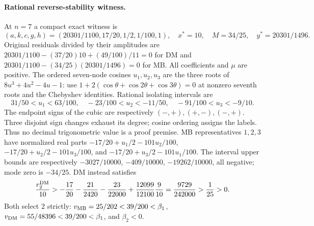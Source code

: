 \paragraph{Rational reverse-stability witness.}
At $n=7$ a compact exact witness is
\begin{equation}
 (a,k,c,g,h)=(20301/1100,17/20,1/2,1/100,1),\quad
 x^*=10,\quad M=34/25,\quad y^*=20301/1496.
 \label{eq:P08-reverse-rational}
\end{equation}
Original residuals divided by their amplitudes are
$20301/1100-(37/20)10+(49/100)/11=0$ for DM and
$20301/1100-(34/25)(20301/1496)=0$ for MB.
All coefficients and $\mu$ are positive.
The ordered seven-node cosines $u_1,u_2,u_3$ are the three roots of
$8u^3+4u^2-4u-1$: use
$1+2(\cos\theta+\cos2\theta+\cos3\theta)=0$ at nonzero seventh roots
and the Chebyshev identities. Rational isolating intervals are
\begin{equation}
 31/50<u_1<63/100,\quad -23/100<u_2<-11/50,\quad
 -91/100<u_3<-9/10.\label{eq:P08-seven-intervals}
\end{equation}
The endpoint signs of the cubic are respectively $(-,+),(+,-),(-,+)$.
Three disjoint sign changes exhaust its degree; cosine ordering assigns
the labels. Thus no decimal trigonometric value is a proof premise.
MB representatives $1,2,3$ have normalized real parts
$-17/20+u_1/2-101u_2/100$,
$-17/20+u_2/2-101u_3/100$, and
$-17/20+u_3/2-101u_1/100$.
The interval upper bounds are respectively $-3027/10000$,
$-409/10000$, $-19262/10000$, all negative; mode zero is $-34/25$.
DM instead satisfies
\[
 \frac{r_2^{\mathrm{DM}}}{10}
 >-\frac{17}{20}-\frac{21}{2420}-\frac{23}{22000}
      +\frac{12099}{12100}\frac9{10}
 =\frac{9729}{242000}>\frac1{25}>0.
\]
Both select $2$ strictly: $v_{\mathrm{MB}}=25/202<39/200<\beta_1$,
$v_{\mathrm{DM}}=55/48396<39/200<\beta_1$, and $\beta_2<0$.

